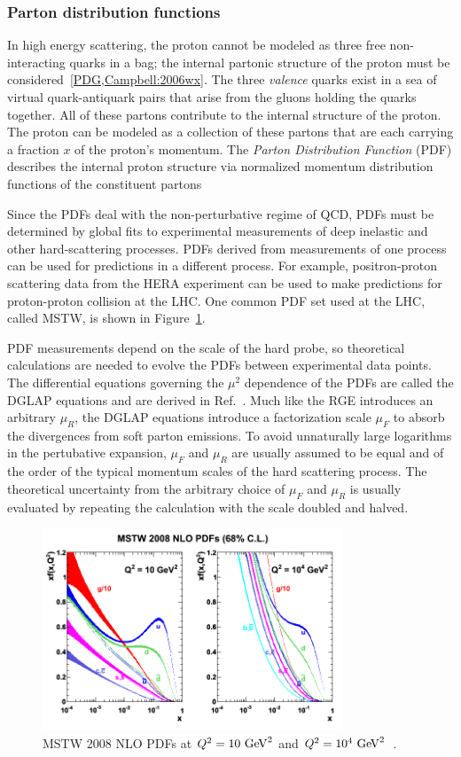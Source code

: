 \subsubsection{Parton distribution functions}

In high energy scattering, the proton cannot be modeled as three free non-interacting quarks in a bag; the internal partonic structure of the proton must be considered~\ref{PDG,Campbell:2006wx}. The three \emph{valence} quarks exist in a sea of virtual quark-antiquark pairs that arise from the gluons holding the quarks together. All of these partons contribute to the internal structure of the proton. The proton can be modeled as a collection of these partons that are each carrying a fraction $x$ of the proton's momentum. The \emph{Parton Distribution Function} (PDF) describes the internal proton structure via normalized momentum distribution functions of the constituent partons

 Since the PDFs deal with the non-perturbative regime of QCD, PDFs must be determined by global fits to experimental measurements of deep inelastic and other hard-scattering processes. PDFs derived from measurements of one process can be used for predictions in a different process. For example, positron-proton scattering data from the HERA experiment can be used to make predictions for proton-proton collision at the LHC. One common PDF set used at the LHC, called MSTW, is shown in Figure~\ref{fig:mstw}.

PDF measurements depend on the scale of the hard probe, so theoretical calculations are needed to evolve the PDFs between experimental data points. The differential equations governing the $\mu^2$ dependence of the PDFs are called the DGLAP equations and are derived in Ref.~\cite{Altarelli:1977zs}. Much like the RGE introduces an arbitrary $\mu_R$, the DGLAP equations introduce a factorization scale $\mu_F$ to absorb the divergences from soft parton emissions. To avoid unnaturally large logarithms in the pertubative expansion,  $\mu_F$ and $\mu_R$ are usually assumed to be equal and of the order of the typical momentum scales of the hard scattering process. The theoretical uncertainty from the arbitrary choice of $\mu_F$ and $\mu_R$ is usually evaluated by repeating the calculation with the scale doubled and halved.
\begin{figure}
\centering
\includegraphics[width=0.8\textwidth]{fig/thry/mstw.png}
\caption{MSTW 2008 NLO PDFs at $Q^2= 10 \gev^2$ and $Q^2= 10^4 \gev^2$~\cite{mstw}.}
\label{fig:mstw}
\end{figure}


